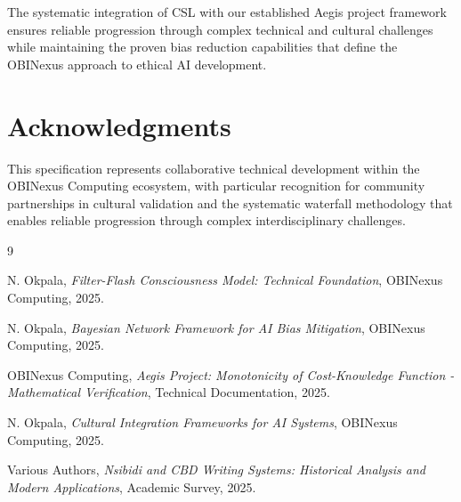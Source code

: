 \documentclass[12pt]{article}
\begin{document}
The systematic integration of CSL with our established Aegis project framework ensures reliable progression through complex technical and cultural challenges while maintaining the proven bias reduction capabilities that define the OBINexus approach to ethical AI development.

\section{Acknowledgments}

This specification represents collaborative technical development within the OBINexus Computing ecosystem, with particular recognition for community partnerships in cultural validation and the systematic waterfall methodology that enables reliable progression through complex interdisciplinary challenges.


\begin{thebibliography}{9}

N. Okpala, \textit{Filter-Flash Consciousness Model: Technical Foundation}, OBINexus Computing, 2025.

N. Okpala, \textit{Bayesian Network Framework for AI Bias Mitigation}, OBINexus Computing, 2025.

OBINexus Computing, \textit{Aegis Project: Monotonicity of Cost-Knowledge Function - Mathematical Verification}, Technical Documentation, 2025.

N. Okpala, \textit{Cultural Integration Frameworks for AI Systems}, OBINexus Computing, 2025.

Various Authors, \textit{Nsibidi and CBD Writing Systems: Historical Analysis and Modern Applications}, Academic Survey, 2025.

\end{thebibliography}
\end{document}
